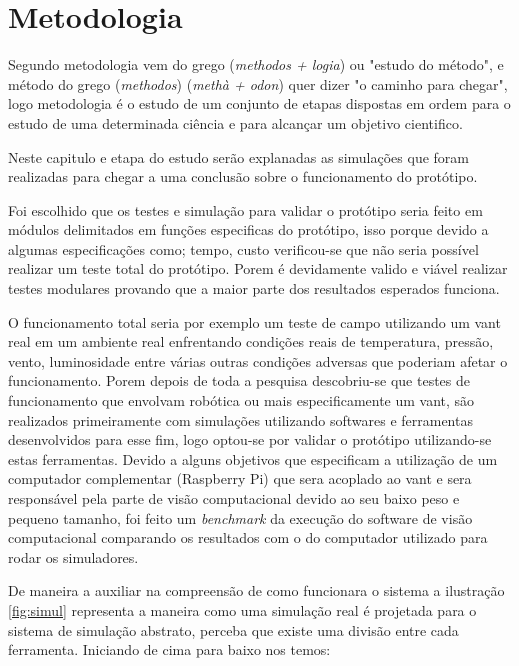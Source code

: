 \chapter{Metodologia}\label{cap:metodologia}
Segundo \cite{metodologia} metodologia vem do grego (\textit{methodos + logia}) ou "estudo do método", e método do grego (\textit{methodos}) (\textit{methà + odon}) quer dizer "o caminho para chegar", logo metodologia é o estudo de um conjunto de etapas dispostas em ordem para o estudo de uma determinada ciência e para alcançar um objetivo cientifico.

Neste capitulo e etapa do estudo serão explanadas as simulações que foram realizadas para chegar a uma conclusão sobre o funcionamento do protótipo.

Foi escolhido que os testes e simulação para validar o protótipo seria feito em módulos delimitados em funções especificas do protótipo, isso porque devido a algumas especificações como; tempo, custo verificou-se que não seria possível realizar um teste total do protótipo. Porem é devidamente valido e viável realizar testes modulares provando que a maior parte dos resultados esperados funciona. 

O funcionamento total seria por exemplo um teste de campo utilizando um vant real em um ambiente real enfrentando condições reais de temperatura, pressão, vento, luminosidade entre várias outras condições adversas que poderiam afetar o funcionamento. Porem depois de toda a pesquisa descobriu-se que testes de funcionamento que envolvam robótica ou mais especificamente um vant, são realizados primeiramente com simulações utilizando softwares e ferramentas desenvolvidos para esse fim, logo optou-se por validar o protótipo utilizando-se estas ferramentas. Devido a alguns objetivos que especificam a utilização de um computador complementar (Raspberry Pi) que sera acoplado ao vant e sera responsável pela parte de visão computacional devido ao seu baixo peso e pequeno tamanho, foi feito um \textit{benchmark} da execução do software de visão computacional comparando os resultados com o do computador utilizado para rodar os simuladores. 

De maneira a auxiliar na compreensão de como funcionara o sistema a ilustração \ref{fig:simul} representa a maneira como uma simulação real é projetada para o sistema de simulação abstrato, perceba que existe uma divisão entre cada ferramenta. Iniciando de cima para baixo nos temos:

